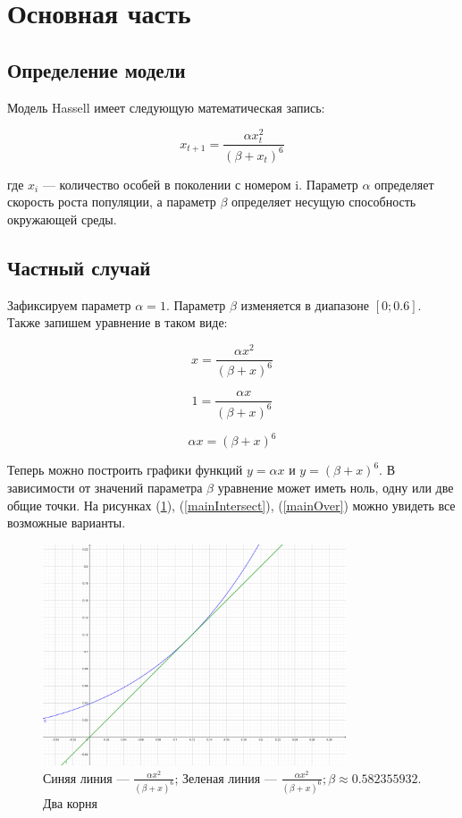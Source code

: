 
\section{Основная часть}

    \subsection{Определение модели}

        Модель Hassell имеет следующую математическая запись:

        \[x_{t+1} = \frac{\alpha x_t^2}{(\beta + x_t)^6}\]

        где \(x_i\) --- количество особей в поколении с номером i. Параметр \(\alpha\) определяет скорость роста популяции, а параметр \(\beta\) определяет несущую способность окружающей среды.
    
    \subsection{Частный случай}
    
        Зафиксируем параметр \(\alpha = 1\). Параметр \(\beta\) изменяется в диапазоне \([0; 0.6]\). Также запишем уравнение в таком виде:

        \[x = \frac{\alpha x^2}{(\beta + x)^6}\]
    
        \[1 = \frac{\alpha x}{(\beta + x)^6}\]

        \[\alpha x = (\beta + x)^6\]

        Теперь можно построить графики функций \(y = \alpha x\) и \(y = (\beta + x)^6\). В зависимости от значений параметра \(\beta\) уравнение может иметь ноль, одну или две общие точки. На рисунках (\ref{mainTouch}), (\ref{mainIntersect}), (\ref{mainOver}) можно увидеть все возможные варианты.

        \begin{figure}[h!]
            \centering
            \includegraphics[width=0.8\textwidth]{images/main_touch.jpg}

            \caption{Синяя линия --- \(\frac{\alpha x^2}{(\beta + x)^6}\); Зеленая линия --- \(\frac{\alpha x^2}{(\beta + x)^6}; \beta \approx 0.582355932\). Два корня}
            \label{mainTouch}
        \end{figure}

